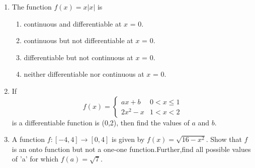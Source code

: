 \documentclass{article}
\providecommand{\abs}[1]{\lvert#1\rvert}
\begin{document}
\begin{enumerate}
	\item The function $f(x) = x \abs{x} $ is
        \begin{enumerate}
            \item continuous and differentiable at $x$ = 0.
            \item continuous but not differentiable at $x$ = 0.
            \item differentiable but not continuous at $x$ = 0.
            \item neither differentiable nor continuous at $x$ = 0.
        \end{enumerate}
	 \item If
 	\begin{equation}
    	f(x) =  
    	\begin{cases}
            ax+b & 0<x \le 1 \\
            2x^2-x & 1<x<2
    	\end{cases}
 	\end{equation}
  	is a differentiable function is (0,2), then find the values of $a$ and $b$.
 	\item A function $ f: [-4,4] \rightarrow [0,4] $ is given by $ f(x) = \sqrt{16-x^2}$. Show that $f$ is an onto function but not a one-one                    function.Further,find all possible values of 'a' for which $ f(a) = \sqrt{7}.$
\end{enumerate}
\end{document}
